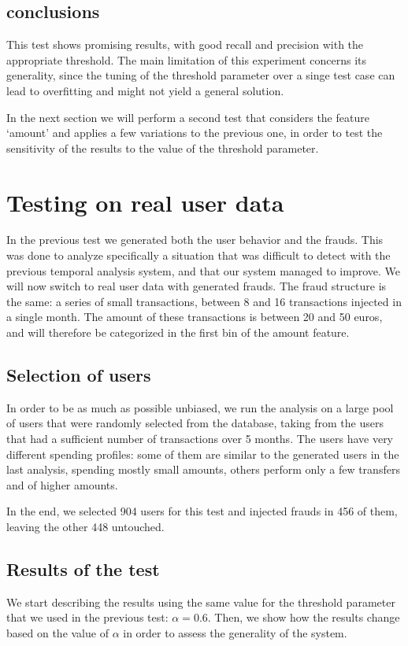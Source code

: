 \subsection{conclusions}

This test shows promising results, with good recall and precision with the appropriate threshold. The main limitation of this experiment concerns its generality, since the tuning of the threshold parameter over a singe test case can lead to overfitting and might not yield a general solution.

In the next section we will perform a second test that considers the feature `amount' and applies a few variations to the previous one, in order to test the sensitivity of the results to the value of the threshold parameter.

\section{Testing on real user data}

In the previous test we generated both the user behavior and the frauds. This was done to analyze specifically a situation that was difficult to detect with the previous temporal analysis system, and that our system managed to improve. We will now switch to real user data with generated frauds. The fraud structure is the same: a series of small transactions, between 8 and 16 transactions injected in a single month. The amount of these transactions is between 20 and 50 euros, and will therefore be categorized in the first bin of the amount feature.

\subsection{Selection of users}
In order to be as much as possible unbiased, we run the analysis on a large pool of users that were randomly selected from the database, taking from the users that had a sufficient number of transactions over 5 months. The users have very different spending profiles: some of them are similar to the generated users in the last analysis, spending mostly small amounts, others perform only a few transfers and of higher amounts.

In the end, we selected 904 users for this test and injected frauds in 456 of them, leaving the other 448 untouched.

\subsection{Results of the test}
We start describing the results using the same value for the threshold parameter that we used in the previous test: $\alpha = 0.6$. Then, we show how the results change based on the value of $\alpha$ in order to assess the generality of the system.

